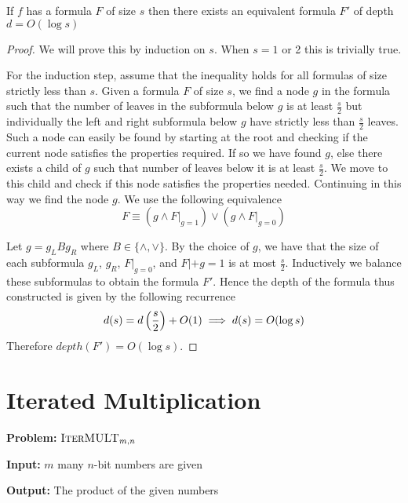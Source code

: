 \begin{theorem}
	If $f$ has a formula $F$ of size $s$ then there exists an equivalent formula $F'$ of depth $d= O(\log s)$
\end{theorem}
\begin{proof}
	We will prove this by induction on $s$. When $s=1 $ or 2 this is trivially true. 
	
	For the induction step, assume that the inequality holds for all formulas of size strictly 	less than $s$. Given a formula $F$ of size $s$, we find a node $g$ in the formula such that the 	number of leaves in the subformula below $g$ is at least $\frac{s}{2}$ but individually the left and right subformula below $g$ have strictly less than $\frac{s}2$ leaves. Such a node can easily be found by 	starting at the root and checking if the current node satisfies the properties required. If so 	we have found $g$, else there exists a child of $g$ such that number of leaves below it is at least $\frac{s}2$. We move to this child and check if this node satisfies the properties needed. Continuing 	in this way we find the node $g$. We use the following equivalence $$F\equiv (g\wedge F|_{g=1})\vee (g\wedge F|_{g=0})$$
	
	Let $g=g_LBg_R$ where $B\in \{\wedge,\vee\}$. By the choice of $g$, we have that the size of each subformula $g_L$, $g_R$, $F|_{g=0}$, and $F|+{g=1}$ is at most $\frac{s}{2}$. Inductively we balance these subformulas to obtain the formula $F'$. Hence the depth of the formula thus constructed is given by the following recurrence $$d(s)=d\left(\frac{s}{2}\right)+O(1)\implies d(s)=O(\log s)$$
	Therefore $depth(F')=O(\log s)$.%
\end{proof}
\section{Iterated Multiplication}
\parinf
\textbf{Problem:} $\textsc{IterMULT}_{m,n}$

\textbf{Input:} $m$ many $n$-bit numbers are given

\textbf{Output:} The product of the given numbers

